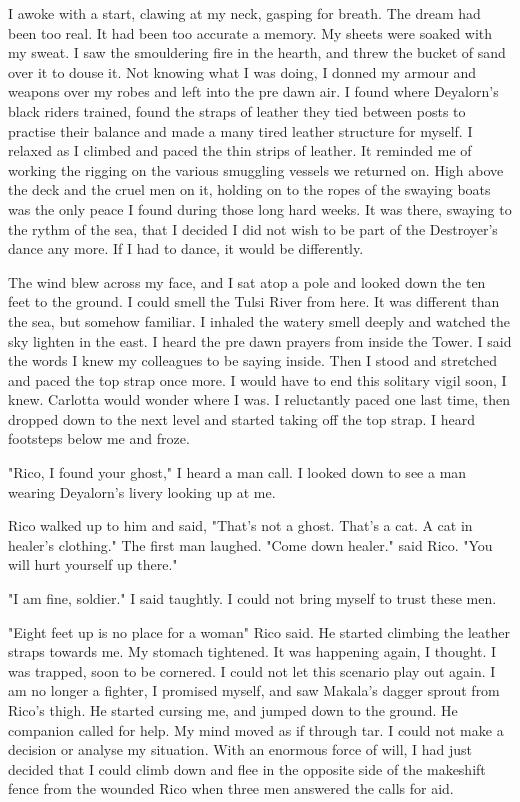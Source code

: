\documentclass{article}
\begin{document}
I awoke with a start, clawing at my neck, gasping for breath. The dream had been too real. It had been too accurate a memory. My sheets were soaked with my sweat. I saw the smouldering fire in the hearth, and threw the bucket of sand over it to douse it. Not knowing what I was doing, I donned my armour and weapons over my robes and left into the pre dawn air. I found where Deyalorn's black riders trained, found the straps of leather they tied between posts to practise their balance and made a many tired leather structure for myself. I relaxed as I climbed and paced the thin strips of leather. It reminded me of working the rigging on the various smuggling vessels we returned on. High above the deck and the cruel men on it, holding on to the ropes of the swaying boats was the only peace I found during those long hard weeks. It was there, swaying to the rythm of the sea,  that I decided I did not wish to be part of the Destroyer's dance any more. If I had to dance, it would be differently. 

The wind blew across my face, and I sat atop a pole and looked down the ten feet to the ground. I could smell the Tulsi River from here. It was different than the sea, but somehow familiar. I inhaled the watery smell deeply and watched the sky lighten in the east. I heard the pre dawn prayers from inside the Tower. I said the words I knew my colleagues to be saying inside. Then I stood and stretched and paced the top strap once more. I would have to end this solitary vigil soon, I knew. Carlotta would wonder where I was. I reluctantly paced one last time, then dropped down to the next level and started taking off the top strap. I heard footsteps below me and froze. 

"Rico, I found your ghost," I heard a man call. I looked down to see a man wearing Deyalorn's livery looking up at me. 

Rico walked up to him and said, "That's not a ghost. That's a cat. A cat in healer's clothing." The first man laughed. "Come down healer." said Rico. "You will hurt yourself up there."

"I am fine, soldier." I said taughtly. I could not bring myself to trust these men.

"Eight feet up is no place for a woman" Rico said. He started climbing the leather straps towards me. My stomach tightened. It was happening again, I thought. I was trapped, soon to be cornered. I could not let this scenario play out again. I am no longer a fighter, I promised myself, and saw Makala's dagger sprout from Rico's thigh. He started cursing me, and jumped down to the ground. He companion called for help. My mind moved as if through tar. I could not make a decision or analyse my situation. With an enormous force of will, I had just decided that I could climb down and flee in the opposite side of the makeshift fence from the wounded Rico when three men answered the calls for aid. 
\end{document}
